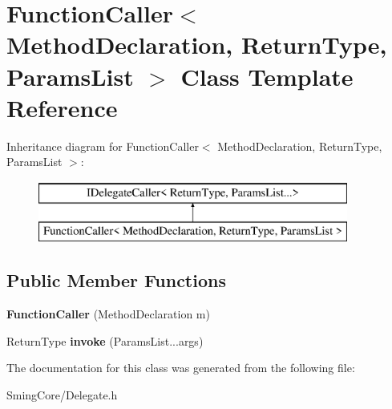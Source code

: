 \hypertarget{class_function_caller}{}\section{Function\+Caller$<$ Method\+Declaration, Return\+Type, Params\+List $>$ Class Template Reference}
\label{class_function_caller}
Inheritance diagram for Function\+Caller$<$ Method\+Declaration, Return\+Type, Params\+List $>$\+:\begin{figure}[H]
\begin{center}
\leavevmode
\includegraphics[height=2.000000cm]{class_function_caller}
\end{center}
\end{figure}
\subsection*{Public Member Functions}
\begin{DoxyCompactItemize}
\item 
\hypertarget{class_function_caller_a57489bd2e7cd5a17d454c5d3ab98cecc}{}{\bfseries Function\+Caller} (Method\+Declaration m)\label{class_function_caller_a57489bd2e7cd5a17d454c5d3ab98cecc}

\item 
\hypertarget{class_function_caller_a129be846b2a8a64fb7816a0f2cf8eb94}{}Return\+Type {\bfseries invoke} (Params\+List...\+args)\label{class_function_caller_a129be846b2a8a64fb7816a0f2cf8eb94}

\end{DoxyCompactItemize}


The documentation for this class was generated from the following file\+:\begin{DoxyCompactItemize}
\item 
Sming\+Core/Delegate.\+h\end{DoxyCompactItemize}
